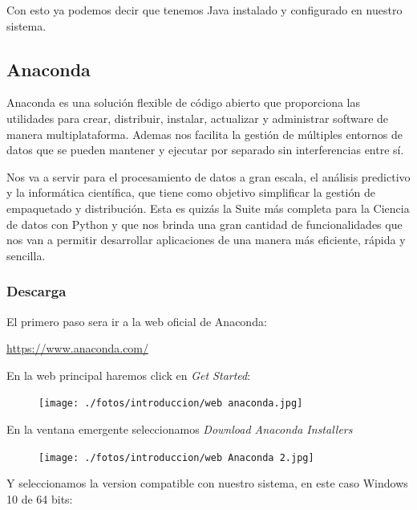 \documentclass[a4paper,10pt]{article}
\begin{document}
Con esto ya podemos decir que tenemos Java instalado y configurado en nuestro sistema. 

\clearpage

\subsection{Anaconda}

Anaconda es una solución flexible de código abierto que proporciona las utilidades para crear, distribuir, instalar, actualizar y administrar software de manera multiplataforma. Ademas nos facilita la gestión de múltiples entornos de datos que se pueden mantener y ejecutar por separado sin interferencias entre sí.
 
Nos va a servir para el procesamiento de datos a gran escala, el análisis predictivo y la informática científica, que tiene como objetivo simplificar la gestión de empaquetado y distribución. Esta es quizás la Suite más completa para la Ciencia de datos con Python y que nos brinda una gran cantidad de funcionalidades que nos van a permitir desarrollar aplicaciones de una manera más eficiente, rápida y sencilla. 


\subsubsection{Descarga}

El primero paso sera ir a la web oficial de Anaconda:
\begin{center}
\href{https://www.anaconda.com/}{https://www.anaconda.com/} 
\end{center}
En la web principal haremos click en \textit{Get Started}:

\begin{figure}[H]
\begin{center}
\texttt{[image: ./fotos/introduccion/web anaconda.jpg]}
\end{center}
\end{figure}

\clearpage

En la ventana emergente seleccionamos \textit{Download Anaconda Installers}

\begin{figure}[H]
\begin{center}
\texttt{[image: ./fotos/introduccion/web Anaconda 2.jpg]}
\end{center}
\end{figure}

Y seleccionamos la version compatible con nuestro sistema, en este caso Windows 10 de 64 bits:
\end{document}
